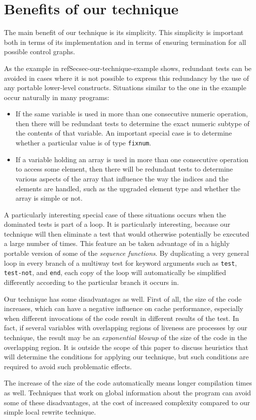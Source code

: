 \section{Benefits of our technique}

The main benefit of our technique is its simplicity.  This simplicity
is important both in terms of its implementation and in terms of
ensuring termination for all possible control graphs.

As the example in refSec{sec-our-technique-example} shows, redundant
tests can be avoided in cases where it is not possible to express this
redundancy by the use of any portable lower-level constructs.
Situations similar to the one in the example occur naturally in many
programs:

\begin{itemize}
\item If the same variable is used in more than one consecutive
  numeric operation, then there will be redundant tests to determine
  the exact numeric subtype of the contents of that variable.  An
  important special case is to determine whether a particular value is
  of type \texttt{fixnum}.
\item If a variable holding an array is used in more than one
  consecutive operation to access some element, then there will be
  redundant tests to determine various aspects of the array that
  influence the way the indices and the elements are handled, such as
  the upgraded element type and whether the array is simple or not.
\end{itemize}

A particularly interesting special case of these situations occurs
when the dominated tests is part of a loop.  It is particularly
interesting, because our technique will then eliminate a test that
would otherwise potentially be executed a large number of times.  This
feature an be taken advantage of in a highly portable version of some
of the \commonlisp{} \emph{sequence functions}.  By duplicating a very
general loop in every branch of a multiway test for keyword arguments
such as \texttt{test}, \texttt{test-not}, and \texttt{end}, each copy
of the loop will automatically be simplified differently according to
the particular branch it occurs in.

Our technique has some disadvantages as well.  First of all, the size
of the code increases, which can have a negative influence on cache
performance, especially when different invocations of the code result
in different results of the test.  In fact, if several variables with
overlapping regions of liveness are processes by our technique, the
result may be an \emph{exponential blowup} of the size of the code in
the overlapping region.  It is outside the scope of this paper to
discuss heuristics that will determine the conditions for applying our
technique, but such conditions are required to avoid such problematic
effects.

The increase of the size of the code automatically means longer
compilation times as well.  Techniques that work on global information
about the program can avoid some of these disadvantages, at the cost
of increased complexity compared to our simple local rewrite
technique.

